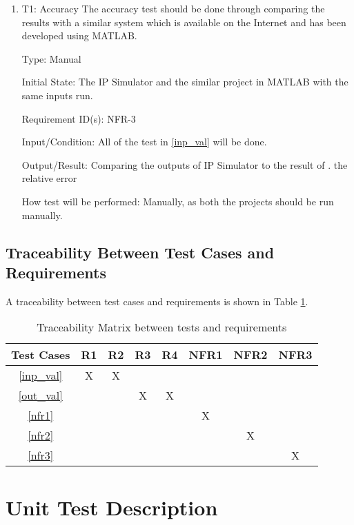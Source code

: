 \documentclass[12pt, titlepage]{article}
\begin{document}
\begin{enumerate}

\item{T1: Accuracy}
\vspace{3mm}
\newline
The accuracy test should be done through comparing the results with a similar system which is available on the Internet and has been developed using MATLAB. \cite{al-khazraji_2022} 

Type: Manual
					
Initial State: The IP Simulator and the similar project in MATLAB with the same inputs run.

Requirement ID(s): NFR-3			

Input/Condition: All of the test in \ref{inp_val} will be done.

Output/Result: Comparing the outputs of IP Simulator to the result of \cite{al-khazraji_2022}.
the relative error

How test will be performed: Manually, as both the projects should be run manually.

\end{enumerate}

\subsection{Traceability Between Test Cases and Requirements}
A traceability between test cases and requirements is shown in Table \ref{tbl_rel}.


\begin{table} [h!]
\caption{Traceability Matrix between tests and requirements}\label{tbl_rel}
\vspace*{3mm}
\centering
\begin{tabular}{|c|c| c| c| c | c|c | c|}
\hline
Test Cases & R1 & R2 & R3& R4& NFR1& NFR2&NFR3  \\
 \hline   
 \ref{inp_val} &X &X & & &&& \\
 \hline
  \ref{out_val}   & & & X&X & && \\
 \hline
  \ref{nfr1}   && & & &  X&&\\
 \hline
  \ref{nfr2}  &&& & &  &X&\\
 \hline
  \ref{nfr3}  &&& & &  &&X\\
 \hline
\end{tabular}

\end{table}


\section{Unit Test Description}
\end{document}
